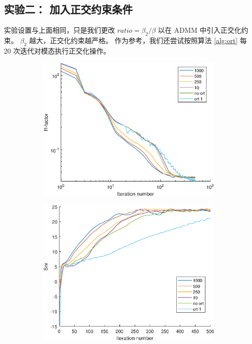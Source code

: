 \documentclass[12pt]{article}
\begin{document}
\subsection{实验二： 加入正交约束条件}
实验设置与上面相同，只是我们更改 $ratio=\beta_2/\beta$ 以在 ADMM 中引入正交化约束。 $\beta_2$ 越大，正交化约束越严格。 作为参考，我们还尝试按照算法 \ref{alg:ort} 每 20 次迭代对模态执行正交化操作。
\begin{figure}[H]
	\begin{subfigure}{.33\textwidth}
		\centering
		\includegraphics[width=1\linewidth]{../figures/ort_R.eps}  
		\label{fig:ort_R}
	\end{subfigure}
	\begin{subfigure}{.3\textwidth}
		\centering
		\includegraphics[width=1\linewidth]{../figures/ort_snr.eps}  

\end{subfigure}
\end{figure}
\end{document}
